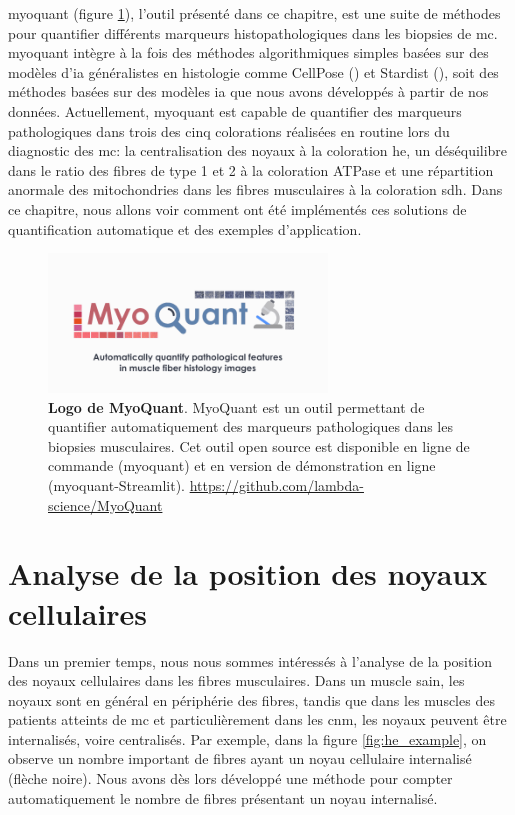 \gls{myoquant} (figure \ref{fig:myoquant_logo}), l'outil présenté dans ce chapitre, est une suite de méthodes pour quantifier différents marqueurs histopathologiques dans les biopsies de \gls{mc}. \gls{myoquant} intègre à la fois des méthodes algorithmiques simples basées sur des modèles d'\gls{ia} généralistes en histologie comme CellPose (\cite{stringer_cellpose_2021}) et Stardist (\cite{weigert_star-convex_2020}), soit des méthodes basées sur des modèles \gls{ia} que nous avons développés à partir de nos données. Actuellement, \gls{myoquant} est capable de quantifier des marqueurs pathologiques dans trois des cinq colorations réalisées en routine lors du diagnostic des \gls{mc}: la centralisation des noyaux à la coloration \gls{he}, un déséquilibre dans le ratio des fibres de type 1 et 2 à la coloration ATPase et une répartition anormale des mitochondries dans les fibres musculaires à la coloration \gls{sdh}. Dans ce chapitre, nous allons voir comment ont été implémentés ces solutions de quantification automatique et des exemples d'application.

\begin{figure}[htbp]
 \centering
 \includegraphics[width=0.66\textwidth]{figures/myoquant_logo.png}
 \caption[Logo MyoQuant]{\textbf{Logo de MyoQuant}. MyoQuant est un outil permettant de quantifier automatiquement des marqueurs pathologiques dans les biopsies musculaires. Cet outil open source est disponible en ligne de commande (\gls{myoquant}) et en version de démonstration en ligne (\gls{myoquant}-Streamlit). \url{https://github.com/lambda-science/MyoQuant}}
 \label{fig:myoquant_logo}
\end{figure}

\section{Analyse de la position des noyaux cellulaires}
Dans un premier temps, nous nous sommes intéressés à l'analyse de la position des noyaux cellulaires dans les fibres musculaires. Dans un muscle sain, les noyaux sont en général en périphérie des fibres, tandis que dans les muscles des patients atteints de \gls{mc} et particulièrement dans les \gls{cnm}, les noyaux peuvent être internalisés, voire centralisés. Par exemple, dans la figure \ref{fig:he_example}, on observe un nombre important de fibres ayant un noyau cellulaire internalisé (flèche noire). Nous avons dès lors développé une méthode pour compter automatiquement le nombre de fibres présentant un noyau internalisé.

